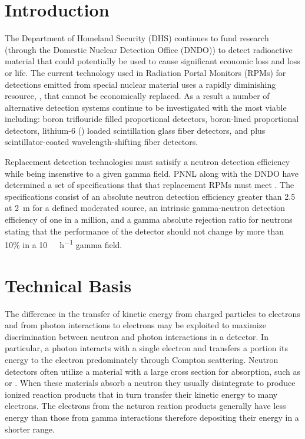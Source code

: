 \documentclass[draftcls,onecolumn]{IEEEtran}
\begin{document}
\section{Introduction}
\label{sec:Intro}
The Department of Homeland Security (DHS) continues to fund research (through the Domestic Nuclear Detection Office (DNDO)) to detect radioactive material that could potentially be used to cause significant economic loss and loss or life.  
The current technology used in Radiation Portal Monitors (RPMs) for detections emitted from special nuclear material uses a rapidly diminishing resource, , that cannot be economically replaced. 
As a result a number of alternative detection systems continue to be investigated with the most viable including: boron triflouride  filled proportional detectors, boron-lined proportional detectors, lithium-6 () loaded scintillation glass fiber detectors, and  plus scintillator-coated wavelength-shifting fiber detectors\cite{kouzes_neutron_2010}.  

Replacement detection technologies must satisify a neutron detection efficiency while being insenstive to a given gamma field.
PNNL along with the DNDO have determined a set of specifications that that replacement RPMs must meet \cite{kouzes_neutron_2010, kouzes_neutron_1999}. 
The specifications consist of an absolute neutron detection efficiency greater than \SI{2.5}{\cps} at \SI{2}{\meter} for a defined moderated source, an intrinsic gamma-neutron detection efficiency of one in a million, and a gamma absolute rejection ratio for neutrons stating that the performance of the detector should not change by more than 10\% in a \SI{10}{\milli\roetgen\per\hour} gamma field.

\section{Technical Basis}
The difference in the transfer of kinetic energy from charged particles to electrons and from photon interactions to electrons may be exploited to maximize discrimination between neutron and photon interactions in a detector.  
In particular, a photon interacts with a single electron and transfers a portion its energy to the electron predominately through Compton scattering. 
Neutron detectors often utilize a material with a large cross section for absorption, such as  or .
When these materials absorb a neutron they usually disintegrate to produce ionized reaction products that in turn transfer their kinetic energy to many electrons.
The electrons from the neturon reation products generally have less energy than those from gamma interactions therefore depositing their energy in a shorter range.
\end{document}
